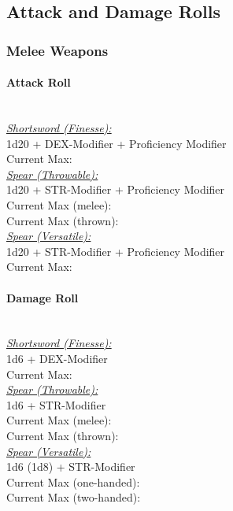 \documentclass[letterpaper,openany,oneside,twocolumn]{book}
\begin{document}
\subsection*{Attack and Damage Rolls}
\subsubsection*{Melee Weapons}
\paragraph*{Attack Roll}\hfill\\
\underline{\textit{Shortsword (Finesse):}}\\
1d20 + DEX-Modifier + Proficiency Modifier\\
\indent Current Max: 
\\
\underline{\textit{Spear (Throwable):}}\\
1d20 + STR-Modifier + Proficiency Modifier\\
\indent Current Max (melee): \\
\indent Current Max (thrown): 
\\
\underline{\textit{Spear (Versatile):}}\\
1d20 + STR-Modifier + Proficiency Modifier\\
\indent Current Max: 
\paragraph*{Damage Roll}\hfill\\
\underline{\textit{Shortsword (Finesse):}}\\
1d6 + DEX-Modifier\\
\indent Current Max: 
\\
\underline{\textit{Spear (Throwable):}}\\
1d6 + STR-Modifier\\
\indent Current Max (melee): \\
\indent Current Max (thrown): 
\\
\underline{\textit{Spear (Versatile):}}\\
1d6 (1d8) + STR-Modifier\\
\indent Current Max (one-handed): \\
\indent Current Max (two-handed): 
\end{document}
